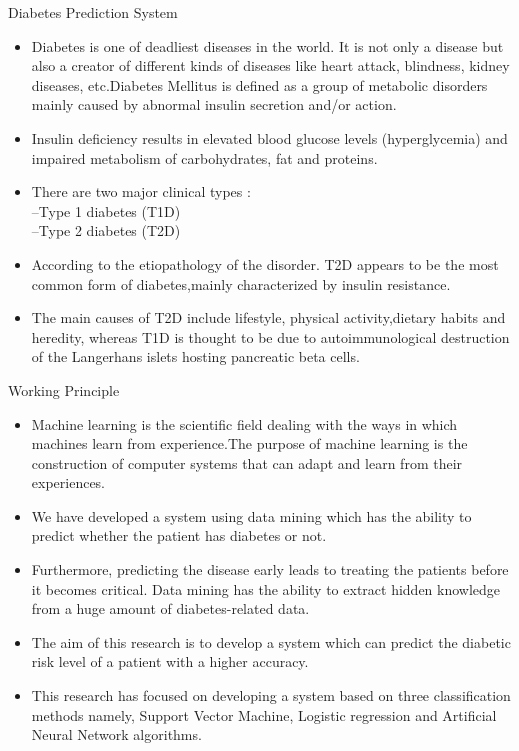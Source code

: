 \documentclass{SKP-beamer}
\begin{document}
\begin{frame}{Diabetes Prediction System}
	\begin{itemize}
		\item Diabetes is one of deadliest diseases in the
		world. It is not only a disease but also a creator of
		different kinds of diseases like heart attack,
		blindness, kidney diseases, etc.Diabetes Mellitus is defined as a group of metabolic
		disorders mainly caused by abnormal insulin
		secretion and/or action. 
		\item Insulin deficiency results in
		elevated blood glucose levels (hyperglycemia) and
		impaired metabolism of carbohydrates, fat and
		proteins.
		\item There are two major clinical types : \\ 
		--Type 1 diabetes (T1D) \\
		--Type 2 diabetes (T2D) 
		\item According to the etiopathology
		of the disorder. T2D appears to be the most common
		form of diabetes,mainly characterized by insulin resistance. 
		\item The main causes of T2D include lifestyle, physical activity,dietary habits and heredity, whereas T1D is thought to be due to autoimmunological destruction of the Langerhans islets hosting pancreatic beta cells.	
	\end{itemize}
\end{frame}

\begin{frame}{Working Principle}
	\begin{itemize}
		\item Machine learning is the scientific field
		dealing with the ways in which machines learn from
		experience.The purpose of
		machine learning is the construction of computer
		systems that can adapt and learn from their experiences.
		\item We have developed a system using data
		mining which has the ability to predict whether the
		patient has diabetes or not.
		\item Furthermore, predicting
		the disease early leads to treating the patients before
		it becomes critical. Data mining has the ability to
		extract hidden knowledge from a huge amount of
		diabetes-related data.
		\item The aim of this research is to develop a system
		which can predict the diabetic risk level of a patient
		with a higher accuracy. 
		\item This research has focused on
		developing a system based on three classification
		methods namely, Support Vector Machine, Logistic
		regression and Artificial Neural Network algorithms. 
	\end{itemize}
\end{frame}
\end{document}
